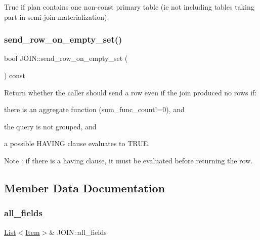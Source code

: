 True if plan contains one non-\/const primary table (ie not including tables taking part in semi-\/join materialization). \mbox{\label{classJOIN_a1db66213c1a83ccccd913b4173a28a85}} 
\subsubsection{\texorpdfstring{send\+\_\+row\+\_\+on\+\_\+empty\+\_\+set()}{send\_row\_on\_empty\_set()}}
{\footnotesize\ttfamily bool J\+O\+I\+N\+::send\+\_\+row\+\_\+on\+\_\+empty\+\_\+set (\begin{DoxyParamCaption}{ }\end{DoxyParamCaption}) const\hspace{0.3cm}{\ttfamily [inline]}}

Return whether the caller should send a row even if the join produced no rows if\+:
\begin{DoxyItemize}
\item there is an aggregate function (sum\+\_\+func\+\_\+count!=0), and
\item the query is not grouped, and
\item a possible H\+A\+V\+I\+NG clause evaluates to T\+R\+UE.
\end{DoxyItemize}

\begin{DoxyNote}{Note}
\+: if there is a having clause, it must be evaluated before returning the row. 
\end{DoxyNote}


\subsection{Member Data Documentation}
\mbox{\label{classJOIN_a6664196553f3202cfc4e740358d6bc0d}} 
\subsubsection{\texorpdfstring{all\+\_\+fields}{all\_fields}}
{\footnotesize\ttfamily \mbox{\hyperlink{classList}{List}}$<$\mbox{\hyperlink{classItem}{Item}}$>$\& J\+O\+I\+N\+::all\+\_\+fields}

